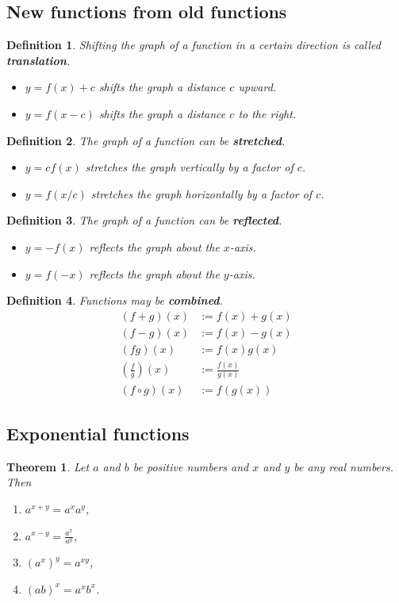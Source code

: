 \documentclass{article}
\theoremstyle{sltheorem}
\newtheorem{definition}{Definition}[section]
\newtheorem{theorem}{Theorem}[section]
\begin{document}
\subsection{New functions from old functions}
\begin{definition}
    Shifting the graph of a function in a certain direction is called \textbf{translation}.
    \begin{itemize}
        \item $y = f(x) + c$ shifts the graph a distance $c$ upward.
        \item $y= f(x - c)$ shifts the graph a distance $c$ to the right.
    \end{itemize}
\end{definition}
\begin{definition}
    The graph of a function can be \textbf{stretched}. 
    \begin{itemize}
        \item $y=cf(x)$ stretches the graph vertically by a factor of $c$.
        \item $y=f(x/c)$ stretches the graph horizontally by a factor of $c$.
    \end{itemize}
\end{definition}
\begin{definition}
    The graph of a function can be \textbf{reflected}.
    \begin{itemize}
        \item $y=-f(x)$ reflects the graph about the $x$-axis.
        \item $y=f(-x)$ reflects the graph about the $y$-axis.
    \end{itemize}
\end{definition}
\begin{definition}
    Functions may be \textbf{combined}.
    \begin{align*}
        (f+g)(x) &:= f(x) + g(x)\\
        (f-g)(x) &:= f(x) - g(x)\\
        (fg)(x) &:= f(x)g(x)\\
        (\frac{f}{g})(x)&:=\frac{f(x)}{g(x)}\\
        (f\circ g)(x) &:= f(g(x))
    \end{align*}
\end{definition}
\setcounter{subsection}{4}
\subsection{Exponential functions}
\begin{theorem}
    Let $a$ and $b$ be positive numbers and $x$ and $y$ be any real numbers. Then
    \begin{enumerate}
        \item $a^{x+y}=a^xa^y$,
        \item $a^{x-y}=\frac{a^x}{a^y}$,
        \item $(a^x)^y=a^{xy}$,
        \item $(ab)^x=a^xb^x$.
    \end{enumerate}
\end{theorem}
\end{document}
